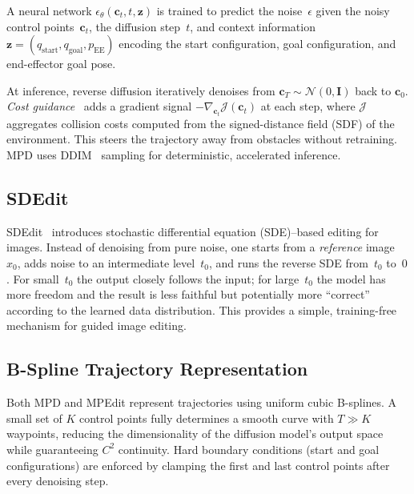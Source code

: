 \documentclass[12pt]{article}
\begin{document}
A neural network $\epsilon_\theta(\mathbf{c}_t, t, \mathbf{z})$ is trained to
predict the noise~$\epsilon$ given the noisy control points~$\mathbf{c}_t$,
the diffusion step~$t$, and context information
$\mathbf{z} = (q_\text{start}, q_\text{goal}, p_\text{EE})$ encoding the
start configuration, goal configuration, and end-effector goal pose.

At inference, reverse diffusion iteratively denoises from
$\mathbf{c}_T \sim \mathcal{N}(0, \mathbf{I})$ back to $\mathbf{c}_0$.
\emph{Cost guidance}~\cite{dhariwal2021diffusion} adds a gradient signal
$-\nabla_{\mathbf{c}_t} \mathcal{J}(\mathbf{c}_t)$ at each step, where
$\mathcal{J}$ aggregates collision costs computed from the signed-distance
field (SDF) of the environment.  This steers the trajectory away from
obstacles without retraining.  MPD uses DDIM~\cite{song2021ddim} sampling for
deterministic, accelerated inference.

\subsection{SDEdit}
\label{sec:sdedit}

SDEdit~\cite{meng2022sdedit} introduces stochastic differential equation
(SDE)--based editing for images.  Instead of denoising from pure noise, one
starts from a \emph{reference} image~$x_0$, adds noise to an intermediate
level~$t_0$, and runs the reverse SDE from~$t_0$ to~$0$.  For small~$t_0$
the output closely follows the input; for large~$t_0$ the model has more
freedom and the result is less faithful but potentially more ``correct''
according to the learned data distribution.  This provides a simple,
training-free mechanism for guided image editing.

\subsection{B-Spline Trajectory Representation}
\label{sec:bspline}

Both MPD and MPEdit represent trajectories using uniform cubic B-splines.  A
small set of $K$ control points fully determines a smooth curve with $T \gg K$
waypoints, reducing the dimensionality of the diffusion model's output space
while guaranteeing $C^2$ continuity.  Hard boundary conditions (start and goal
configurations) are enforced by clamping the first and last control points
after every denoising step.

\end{document}
